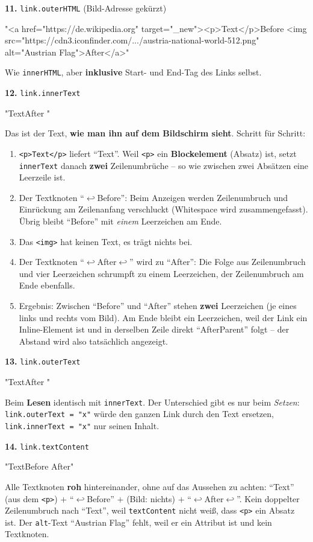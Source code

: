 \documentclass[a4paper,11pt]{article}
\newcommand{\nl}{\ensuremath{\hookleftarrow}}
\newcommand{\ws}{\textvisiblespace}
\begin{document}
\textbf{11.} \lstinline|link.outerHTML| (Bild-Adresse gekürzt)
\begin{ausgabe}
"<a href="https://de.wikipedia.org" target="_new"><p>Text</p>\n    Before <img src="https://cdn3.iconfinder.com/.../austria-national-world-512.png" alt="Austrian Flag">\n    After\n</a>"
\end{ausgabe}
Wie \texttt{innerHTML}, aber \textbf{inklusive} Start- und End-Tag des Links selbst.

\textbf{12.} \lstinline|link.innerText|
\begin{ausgabe}
"Text\n\nBefore  After "
\end{ausgabe}
Das ist der Text, \textbf{wie man ihn auf dem Bildschirm sieht}. Schritt für Schritt:
\begin{enumerate}[nosep]
\item \texttt{<p>Text</p>} liefert "`Text"'. Weil \texttt{<p>} ein \textbf{Blockelement} (Absatz) ist, setzt
      \texttt{innerText} danach \textbf{zwei} Zeilenumbrüche -- so wie zwischen zwei Absätzen eine Leerzeile ist.
\item Der Textknoten "`\nl\ws\ws\ws\ws Before\ws"': Beim Anzeigen werden Zeilenumbruch und Einrückung am Zeilenanfang
      verschluckt (Whitespace wird zusammengefasst). Übrig bleibt "`Before\ws"' mit \emph{einem} Leerzeichen am Ende.
\item Das \texttt{<img>} hat keinen Text, es trägt nichts bei.
\item Der Textknoten "`\nl\ws\ws\ws\ws After\nl"' wird zu "`\ws After\ws"': Die Folge aus Zeilenumbruch und vier
      Leerzeichen schrumpft zu einem Leerzeichen, der Zeilenumbruch am Ende ebenfalls.
\item Ergebnis: Zwischen "`Before"' und "`After"' stehen \textbf{zwei} Leerzeichen (je eines links und rechts vom
      Bild). Am Ende bleibt ein Leerzeichen, weil der Link ein Inline-Element ist und in derselben Zeile direkt
      "`AfterParent"' folgt -- der Abstand wird also tatsächlich angezeigt.
\end{enumerate}

\textbf{13.} \lstinline|link.outerText|
\begin{ausgabe}
"Text\n\nBefore  After "
\end{ausgabe}
Beim \textbf{Lesen} identisch mit \texttt{innerText}. Der Unterschied gibt es nur beim \emph{Setzen}:
\lstinline|link.outerText = "x"| würde den ganzen Link durch den Text ersetzen, \lstinline|link.innerText = "x"| nur seinen Inhalt.

\textbf{14.} \lstinline|link.textContent|
\begin{ausgabe}
"Text\n    Before \n    After\n"
\end{ausgabe}
Alle Textknoten \textbf{roh} hintereinander, ohne auf das Aussehen zu achten: "`Text"' (aus dem \texttt{<p>}) $+$
"`\nl\ws\ws\ws\ws Before\ws"' $+$ (Bild: nichts) $+$ "`\nl\ws\ws\ws\ws After\nl"'. Kein doppelter Zeilenumbruch
nach "`Text"', weil \texttt{textContent} nicht weiß, dass \texttt{<p>} ein Absatz ist. Der \texttt{alt}-Text
"`Austrian Flag"' fehlt, weil er ein Attribut ist und kein Textknoten.
\end{document}
